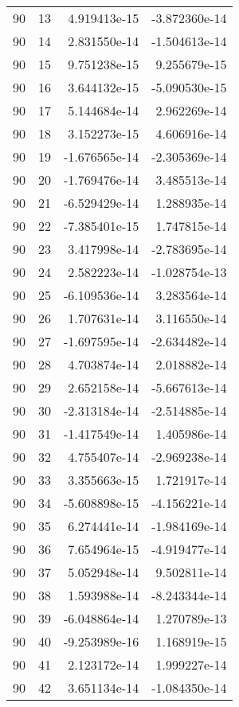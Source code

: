 \begin{tabular}{rrrr}
  90 &   13 &  4.919413e-15 & -3.872360e-14 \\
  90 &   14 &  2.831550e-14 & -1.504613e-14 \\
  90 &   15 &  9.751238e-15 &  9.255679e-15 \\
  90 &   16 &  3.644132e-15 & -5.090530e-15 \\
  90 &   17 &  5.144684e-14 &  2.962269e-14 \\
  90 &   18 &  3.152273e-15 &  4.606916e-14 \\
  90 &   19 & -1.676565e-14 & -2.305369e-14 \\
  90 &   20 & -1.769476e-14 &  3.485513e-14 \\
  90 &   21 & -6.529429e-14 &  1.288935e-14 \\
  90 &   22 & -7.385401e-15 &  1.747815e-14 \\
  90 &   23 &  3.417998e-14 & -2.783695e-14 \\
  90 &   24 &  2.582223e-14 & -1.028754e-13 \\
  90 &   25 & -6.109536e-14 &  3.283564e-14 \\
  90 &   26 &  1.707631e-14 &  3.116550e-14 \\
  90 &   27 & -1.697595e-14 & -2.634482e-14 \\
  90 &   28 &  4.703874e-14 &  2.018882e-14 \\
  90 &   29 &  2.652158e-14 & -5.667613e-14 \\
  90 &   30 & -2.313184e-14 & -2.514885e-14 \\
  90 &   31 & -1.417549e-14 &  1.405986e-14 \\
  90 &   32 &  4.755407e-14 & -2.969238e-14 \\
  90 &   33 &  3.355663e-15 &  1.721917e-14 \\
  90 &   34 & -5.608898e-15 & -4.156221e-14 \\
  90 &   35 &  6.274441e-14 & -1.984169e-14 \\
  90 &   36 &  7.654964e-15 & -4.919477e-14 \\
  90 &   37 &  5.052948e-14 &  9.502811e-14 \\
  90 &   38 &  1.593988e-14 & -8.243344e-14 \\
  90 &   39 & -6.048864e-14 &  1.270789e-13 \\
  90 &   40 & -9.253989e-16 &  1.168919e-15 \\
  90 &   41 &  2.123172e-14 &  1.999227e-14 \\
  90 &   42 &  3.651134e-14 & -1.084350e-14 \\

\end{tabular}
